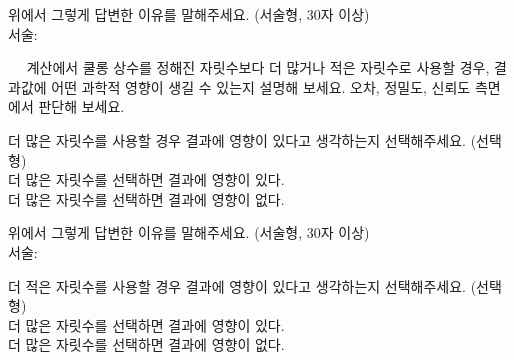 \begin{graybox}\vspace*{0.2em}\bn
위에서 그렇게 답변한 이유를 말해주세요.
(서술형, 30자 이상) \\ 서술: 
\vspace*{2.4em}\end{graybox}\vspace{0.4em}


\clearpage


\begin{graybox}
~~ 계산에서 쿨롱 상수를 정해진 자릿수보다 더 많거나 적은 자릿수로 사용할 경우, 결과값에
어떤 과학적 영향이 생길 수 있는지 설명해 보세요. 오차, 정밀도, 신뢰도 측면에서 판단해
보세요.
\end{graybox}\vspace{0.4em}

\begin{graybox}\vspace*{0.2em}\bn
더 많은 자릿수를 사용할 경우 결과에 영향이 있다고 생각하는지 선택해주세요.
(선택형) \\
\raisebox{-0.25ex}{\scalebox{1.4}{$\Box$}} 더 많은 자릿수를 선택하면 결과에 영향이 있다. \\
\raisebox{-0.25ex}{\scalebox{1.4}{$\Box$}} 더 많은 자릿수를 선택하면 결과에 영향이 없다.
\vspace*{0.4em}\end{graybox}\vspace{0.4em}

\begin{graybox}\vspace*{0.2em}\bn
위에서 그렇게 답변한 이유를 말해주세요.
(서술형, 30자 이상) \\ 서술: 
\vspace*{2.4em}\end{graybox}\vspace{0.4em}

\begin{graybox}\vspace*{0.2em}\bn
더 적은 자릿수를 사용할 경우 결과에 영향이 있다고 생각하는지 선택해주세요.
(선택형) \\
\raisebox{-0.25ex}{\scalebox{1.4}{$\Box$}} 더 많은 자릿수를 선택하면 결과에 영향이 있다. \\
\raisebox{-0.25ex}{\scalebox{1.4}{$\Box$}} 더 많은 자릿수를 선택하면 결과에 영향이 없다.
\vspace*{0.4em}\end{graybox}\vspace{0.4em}

